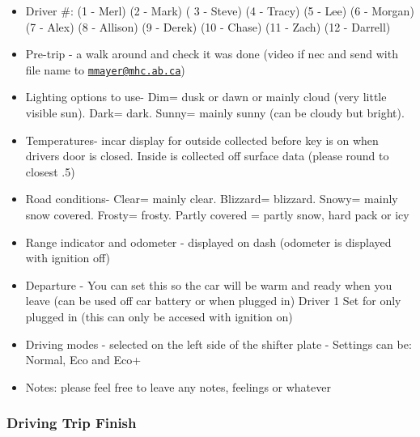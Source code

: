\documentclass[]{article}
\begin{document}
\begin{itemize}
\item
  Driver \#: (1 - Merl) (2 - Mark) ( 3 - Steve) (4 - Tracy) (5 - Lee) (6
  - Morgan) (7 - Alex) (8 - Allison) (9 - Derek) (10 - Chase) (11 -
  Zach) (12 - Darrell)
\item
  Pre-trip - a walk around and check it was done (video if nec and send
  with file name to
  \href{mailto:mmayer@mhc.ab.ca}{\nolinkurl{mmayer@mhc.ab.ca}})
\item
  Lighting options to use- Dim= dusk or dawn or mainly cloud (very
  little visible sun). Dark= dark. Sunny= mainly sunny (can be cloudy
  but bright).
\item
  Temperatures- incar display for outside collected before key is on
  when drivers door is closed. Inside is collected off surface data
  (please round to closest .5)
\item
  Road conditions- Clear= mainly clear. Blizzard= blizzard. Snowy=
  mainly snow covered. Frosty= frosty. Partly covered = partly snow,
  hard pack or icy
\item
  Range indicator and odometer - displayed on dash (odometer is
  displayed with ignition off)
\item
  Departure - You can set this so the car will be warm and ready when
  you leave (can be used off car battery or when plugged in) Driver 1
  Set for only plugged in (this can only be accesed with ignition on)
\item
  Driving modes - selected on the left side of the shifter plate -
  Settings can be: Normal, Eco and Eco+
\item
  Notes: please feel free to leave any notes, feelings or whatever
\end{itemize}

\hypertarget{driving-trip-finish}{%
\subsubsection{Driving Trip Finish}\label{driving-trip-finish}}
\end{document}
